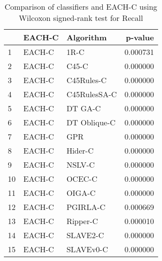 \begin{table}
\footnotesize
\caption{Comparison of classifiers and EACH-C using Wilcoxon signed-rank test for Recall}
\label{tab:EACH-C wilcoxon Recall comparison}
\begin{tabular}{lllr}
\hline
 & EACH-C & Algorithm & p-value \\
\hline
1 & EACH-C & 1R-C & 0.000731 \\
2 & EACH-C & C45-C & 0.000000 \\
3 & EACH-C & C45Rules-C & 0.000000 \\
4 & EACH-C & C45RulesSA-C & 0.000000 \\
5 & EACH-C & DT GA-C & 0.000000 \\
6 & EACH-C & DT Oblique-C & 0.000000 \\
7 & EACH-C & GPR & 0.000000 \\
8 & EACH-C & Hider-C & 0.000000 \\
9 & EACH-C & NSLV-C & 0.000000 \\
10 & EACH-C & OCEC-C & 0.000000 \\
11 & EACH-C & OIGA-C & 0.000000 \\
12 & EACH-C & PGIRLA-C & 0.000669 \\
13 & EACH-C & Ripper-C & 0.000010 \\
14 & EACH-C & SLAVE2-C & 0.000000 \\
15 & EACH-C & SLAVEv0-C & 0.000000 \\
\hline
\end{tabular}
\end{table}
